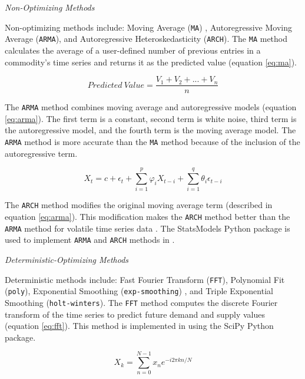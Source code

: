 \noindent
\textit{Non-Optimizing Methods}

Non-optimizing methods include: Moving Average (\texttt{MA})
, Autoregressive Moving Average (\texttt{ARMA}), and 
Autoregressive Heteroskedasticity (\texttt{ARCH}). 
The \texttt{MA} method calculates the average of 
a user-defined number of previous entries in a commodity's 
time series and returns it as the predicted value 
(equation \ref{eq:ma}).

\begin{equation}
	\label{eq:ma}
	Predicted\ Value = \frac{V_1+V_2+...+V_n}{n}
\end{equation}

The \texttt{ARMA} method combines moving average and
autoregressive models (equation \ref{eq:arma}).
The first term is a constant, second term is 
white noise, third term is the autoregressive
model, and the fourth term is the moving average
model.
The \texttt{ARMA} method is more accurate than the 
\texttt{MA} method 
because of the inclusion of the autoregressive term. 

\begin{equation}
	\label{eq:arma}
	X_t = c + \epsilon_t + 
	\sum_{i=1}^p\varphi_i X_{t-i} +	
	\sum_{i=1}^q\theta_i\epsilon_{t-i}
\end{equation}

The \texttt{ARCH} method modifies the original moving 
average term (described in equation \ref{eq:arma}). 
This modification makes the \texttt{ARCH} method 
better than the \texttt{ARMA} method for volatile time 
series data \cite{flanagan_methods_2019}. 
The StatsModels \cite{github_community_statsmodels:_2019}
Python package is used to implement \texttt{ARMA} and 
\texttt{ARCH} methods in \deploy. 

\noindent
\textit{Deterministic-Optimizing Methods}

Deterministic methods include: 
Fast Fourier Transform (\texttt{FFT}), 
Polynomial Fit (\texttt{poly}), 
Exponential Smoothing (\texttt{exp-smoothing})
, and Triple Exponential Smoothing (\texttt{holt-winters}). 
The \texttt{FFT} method computes the discrete Fourier transform 
of the time series to predict future demand and supply 
values (equation \ref{eq:fft}).
This method is implemented in \deploy using the 
SciPy \cite{jones_scipy:_2016} Python package. 

\begin{equation}
	\label{eq:fft}
	X_k = \sum_{n=0}^{N-1}x_n e^{-i2\pi kn/N}
\end{equation}

